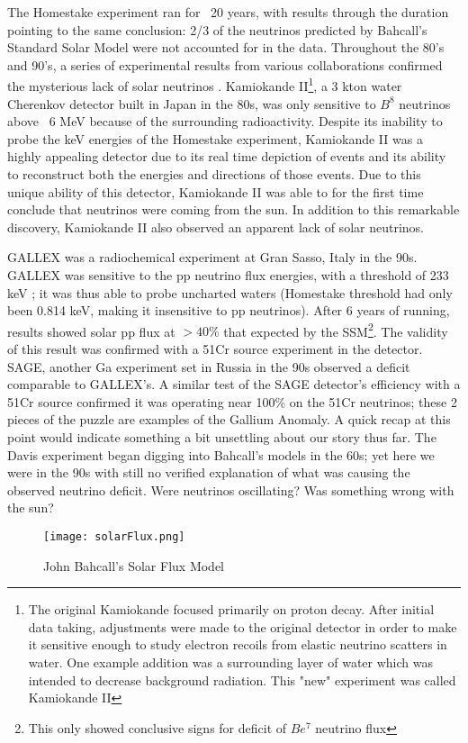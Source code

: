 \documentclass[12pt]{article}
\begin{document}
\par The Homestake experiment ran for ~20 years, with results through the duration pointing to the same conclusion: 2/3 of the neutrinos predicted by Bahcall's Standard Solar Model were not accounted for in the data\cite{ray0}.  Throughout the 80's and 90's, a series of experimental results from various collaborations confirmed the mysterious lack of solar neutrinos \cite{rayreview} \cite{kam0} \cite{sno0}.  Kamiokande II\footnote{The original Kamiokande focused primarily on proton decay. After initial data taking, adjustments were made to the original detector in order to make it sensitive enough to study electron recoils from elastic neutrino scatters in water. One example addition was a surrounding layer of water which was intended to decrease background radiation.  This "new" experiment was called Kamiokande II}, a 3 kton water Cherenkov detector built in Japan in the 80s, was only sensitive to $B^8$ neutrinos above ~6 MeV\cite{kam0} because of the surrounding radioactivity. Despite its inability to probe the keV energies of the Homestake experiment, Kamiokande II was a highly appealing detector due to its real time depiction of events and its ability to reconstruct both the energies and directions of those events\cite{kam0}. Due to this unique ability of this detector, Kamiokande II was able to for the first time conclude that neutrinos were coming from the sun.  In addition to this remarkable discovery, Kamiokande II also observed an apparent lack of solar neutrinos.


\par GALLEX was a radiochemical experiment at Gran Sasso, Italy in the 90s. GALLEX was sensitive to the pp neutrino flux energies, with a threshold of 233 keV \cite{gal0}; it was thus able to probe uncharted waters (Homestake threshold had only been 0.814 keV, making it insensitive to pp neutrinos).   After 6 years of running, results showed solar pp flux at $>40\%$ that expected by the SSM\footnote{This only showed conclusive signs for deficit of $Be^7$ neutrino flux}. The validity of this result was confirmed with a 51Cr source experiment in the detector\cite{gal2}. SAGE, another Ga experiment set in Russia in the 90s observed a deficit comparable to GALLEX's.   A similar test of the SAGE detector's efficiency with a 51Cr source confirmed it was operating near 100\% on the 51Cr neutrinos\cite{sage};  these 2 pieces of the puzzle are examples of the Gallium Anomaly.  
A quick recap at this point would indicate something a bit unsettling about our story thus far. The Davis experiment began digging into Bahcall's models in the 60s; yet here we were in the 90s with still no verified explanation of what was causing the observed neutrino deficit.  Were neutrinos oscillating? Was something wrong with the sun?\cite{Clarke} 
\\ \begin{wrapfigure}{r}{0.5\textwidth}
\begin{center}
\captionsetup{justification=centering}
\texttt{[image: solarFlux.png]}
\end{center}
\caption{John Bahcall's Solar Flux Model}
\end{wrapfigure}
\end{document}
